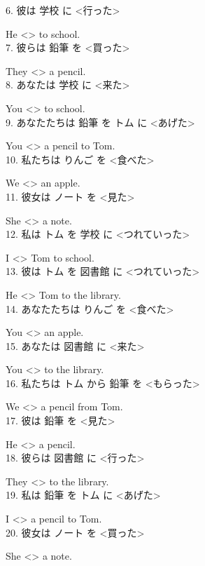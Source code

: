 \documentclass[uplatex,
paper=a4,
fontsize=18pt,
jafontsize=16pt,
number_of_lines=30,
line_length=30zh,
baselineskip=25pt,
]{jlreq}
\begin{document}
6.  彼は 学校 に <行った>

  He <\hspace{3em}> to school.
\\

7.  彼らは 鉛筆 を <買った>

  They <\hspace{3em}> a pencil.
\\

8.  あなたは 学校 に <来た>

  You <\hspace{3em}> to school.
\\

9.  あなたたちは 鉛筆 を トム に <あげた>

  You <\hspace{3em}> a pencil to Tom.
\\

10.  私たちは りんご を <食べた>

  We <\hspace{3em}> an apple.
\\

11.  彼女は ノート を <見た>

  She <\hspace{3em}> a note.
\\

12.  私は トム を 学校 に <つれていった>

  I <\hspace{3em}> Tom to school.
\\

13.  彼は トム を 図書館 に <つれていった>

  He <\hspace{3em}> Tom to the library.
\\

14.  あなたたちは りんご を <食べた>

  You <\hspace{3em}> an apple.
\\

15.  あなたは 図書館 に <来た>

  You <\hspace{3em}> to the library.
\\

16.  私たちは トム から 鉛筆 を <もらった>

  We <\hspace{3em}> a pencil from Tom.
\\

17.  彼は 鉛筆 を <見た>

  He <\hspace{3em}> a pencil.
\\

18.  彼らは 図書館 に <行った>

  They <\hspace{3em}> to the library.
\\

19.  私は 鉛筆 を トム に <あげた>

  I <\hspace{3em}> a pencil to Tom.
\\

20.  彼女は ノート を <買った>

  She <\hspace{3em}> a note.
\\
\end{document}
